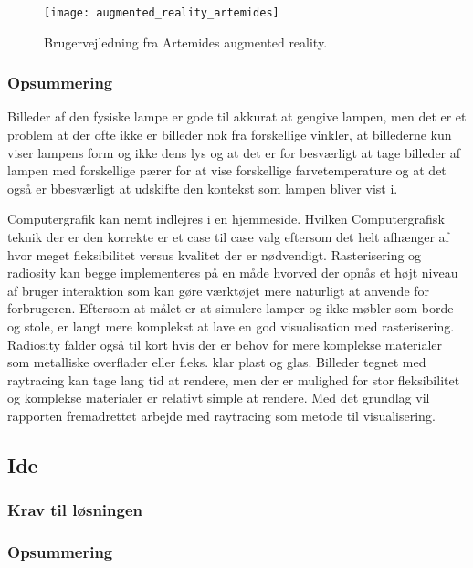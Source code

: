 \begin{figure}[H]
    \centering
    \texttt{[image: augmented\_reality\_artemides]}
    \caption{Brugervejledning fra Artemides augmented reality.}
    \label{fig:augmented_reality_artemides}
\end{figure} 


\subsubsection*{Opsummering}
Billeder af den fysiske lampe er gode til akkurat at gengive lampen, men det er et problem at der ofte ikke er billeder nok fra forskellige vinkler, at billederne kun viser lampens form og ikke dens lys og at det er for besværligt at tage billeder af lampen med forskellige pærer for at vise forskellige farvetemperature og at det også er bbesværligt at udskifte den kontekst som lampen bliver vist i. 

Computergrafik kan nemt indlejres i en hjemmeside. Hvilken Computergrafisk teknik der er den korrekte er et case til case valg eftersom det helt afhænger af hvor meget fleksibilitet versus kvalitet der er nødvendigt. Rasterisering og radiosity kan begge implementeres på en måde hvorved der opnås et højt niveau af bruger interaktion som kan gøre værktøjet mere naturligt at anvende for forbrugeren. Eftersom at målet er at simulere lamper og ikke møbler som borde og stole, er langt mere komplekst at lave en god visualisation med rasterisering. Radiosity falder også til kort hvis der er behov for mere komplekse materialer som metalliske overflader eller f.eks. klar plast og glas. Billeder tegnet med raytracing kan tage lang tid at rendere, men der er mulighed for stor fleksibilitet og komplekse materialer er relativt simple at rendere. Med det grundlag vil rapporten fremadrettet arbejde med raytracing som metode til visualisering.

\subsection{Ide}



\subsubsection{Krav til løsningen}




\subsubsection*{Opsummering}


